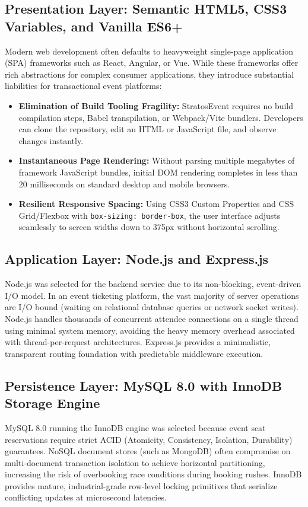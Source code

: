 \documentclass[11pt,a4paper]{report}
\begin{document}
\subsection{Presentation Layer: Semantic HTML5, CSS3 Variables, and Vanilla ES6+}
Modern web development often defaults to heavyweight single-page application (SPA) frameworks such as React, Angular, or Vue. While these frameworks offer rich abstractions for complex consumer applications, they introduce substantial liabilities for transactional event platforms:
\begin{itemize}[leftmargin=1.5em, itemsep=0.3em]
    \item \textbf{Elimination of Build Tooling Fragility:} StratosEvent requires no build compilation steps, Babel transpilation, or Webpack/Vite bundlers. Developers can clone the repository, edit an HTML or JavaScript file, and observe changes instantly.
    \item \textbf{Instantaneous Page Rendering:} Without parsing multiple megabytes of framework JavaScript bundles, initial DOM rendering completes in less than 20 milliseconds on standard desktop and mobile browsers.
    \item \textbf{Resilient Responsive Spacing:} Using CSS3 Custom Properties and CSS Grid/Flexbox with \texttt{box-sizing: border-box}, the user interface adjusts seamlessly to screen widths down to 375px without horizontal scrolling.
\end{itemize}

\subsection{Application Layer: Node.js and Express.js}
Node.js was selected for the backend service due to its non-blocking, event-driven I/O model. In an event ticketing platform, the vast majority of server operations are I/O bound (waiting on relational database queries or network socket writes). Node.js handles thousands of concurrent attendee connections on a single thread using minimal system memory, avoiding the heavy memory overhead associated with thread-per-request architectures. Express.js provides a minimalistic, transparent routing foundation with predictable middleware execution.

\subsection{Persistence Layer: MySQL 8.0 with InnoDB Storage Engine}
MySQL 8.0 running the InnoDB engine was selected because event seat reservations require strict ACID (Atomicity, Consistency, Isolation, Durability) guarantees. NoSQL document stores (such as MongoDB) often compromise on multi-document transaction isolation to achieve horizontal partitioning, increasing the risk of overbooking race conditions during booking rushes. InnoDB provides mature, industrial-grade row-level locking primitives that serialize conflicting updates at microsecond latencies.
\end{document}
